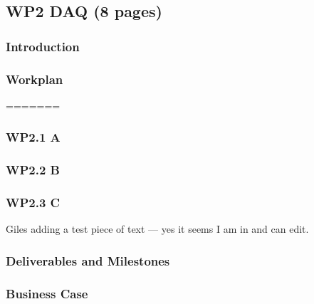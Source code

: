 \subsection{WP2 DAQ (8 pages)}

\subsubsection{Introduction}

\subsubsection{Workplan}
=======

\subsubsection{WP2.1 A}
\subsubsection{WP2.2 B}
\subsubsection{WP2.3 C}

Giles adding a test piece of text --- yes it seems I am in and can edit.

\subsubsection{Deliverables and Milestones}

\subsubsection{Business Case}
